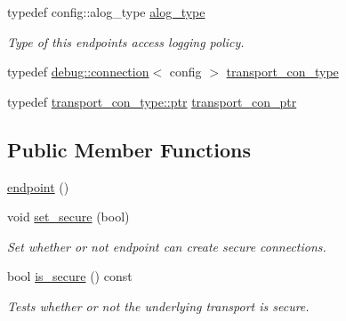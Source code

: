 \begin{DoxyCompactItemize}
typedef config\+::alog\+\_\+type \hyperlink{classwebsocketpp_1_1transport_1_1debug_1_1endpoint_ab2b8a06c2ba2a9ae26def00aefcbc930}{alog\+\_\+type}
\begin{DoxyCompactList}\small\item\em Type of this endpoint\textquotesingle{}s access logging policy. \end{DoxyCompactList}\item 
typedef \hyperlink{classwebsocketpp_1_1transport_1_1debug_1_1connection}{debug\+::connection}$<$ config $>$ \hyperlink{classwebsocketpp_1_1transport_1_1debug_1_1endpoint_a267bc670b0cecf80aa39ee266785e9ba}{transport\+\_\+con\+\_\+type}
\item 
typedef \hyperlink{classwebsocketpp_1_1transport_1_1debug_1_1connection_a40631f93557c3308c2c8c7897e6a4825}{transport\+\_\+con\+\_\+type\+::ptr} \hyperlink{classwebsocketpp_1_1transport_1_1debug_1_1endpoint_ab261a090fca072aea9b5dba04aba4c6d}{transport\+\_\+con\+\_\+ptr}
\end{DoxyCompactItemize}
\subsection*{Public Member Functions}
\begin{DoxyCompactItemize}
\item 
\hyperlink{classwebsocketpp_1_1transport_1_1debug_1_1endpoint_aff98ad5f6d51834fb9a1c2588b388493}{endpoint} ()
\item 
void \hyperlink{classwebsocketpp_1_1transport_1_1debug_1_1endpoint_aa93a1b98a940de00aadd784b3c058aa6}{set\+\_\+secure} (bool)
\begin{DoxyCompactList}\small\item\em Set whether or not endpoint can create secure connections. \end{DoxyCompactList}\item 
bool \hyperlink{classwebsocketpp_1_1transport_1_1debug_1_1endpoint_a689db4f7c6e485ec1af7989c6ae1329b}{is\+\_\+secure} () const 
\begin{DoxyCompactList}\small\item\em Tests whether or not the underlying transport is secure. \end{DoxyCompactList}\end{DoxyCompactItemize}
